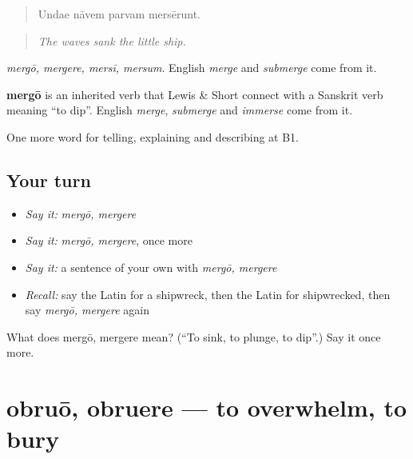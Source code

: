 \begin{quote}
Undae nāvem parvam mersērunt.
\end{quote}

\begin{quote}
\emph{The waves sank the little ship.}
\end{quote}

\emph{mergō, mergere, mersī, mersum}. English \emph{merge} and \emph{submerge} come from it.

\begin{cousinweb}
\textbf{mergō} is an inherited verb that Lewis \& Short connect with a Sanskrit verb meaning \textquotedblleft{}to dip\textquotedblright{}. English \emph{merge}, \emph{submerge} and \emph{immerse} come from it.
\end{cousinweb}

\begin{grammarlens}[title={What you've built}]
One more word for telling, explaining and describing at B1.
\end{grammarlens}

\subsection*{Your turn}
\begin{itemize}
\raggedright
  \item \emph{Say it:} \emph{mergō, mergere}
  \item \emph{Say it:} \emph{mergō, mergere}, once more
  \item \emph{Say it:} a sentence of your own with \emph{mergō, mergere}
  \item \emph{Recall:} say the Latin for a shipwreck, then the Latin for shipwrecked, then say \emph{mergō, mergere} again
\end{itemize}

\begin{tcolorbox}[breakable,colback=teal!4,colframe=teal!35!black,title={Before you move on}]
What does mergō, mergere mean? (\textquotedblleft{}To sink, to plunge, to dip\textquotedblright{}.) Say it once more.
\end{tcolorbox}
\section[obruō, obruere]{obruō, obruere — to overwhelm, to bury}

\label{lesson:LA-C315-obruo}




